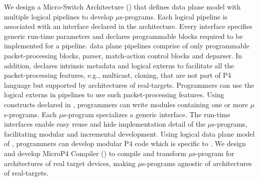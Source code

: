 \documentclass[letterpaper,twocolumn,10pt]{article}
\begin{document}
We design a Micro-Switch Architecture (\uarch) that defines data plane model with multiple logical pipelines to develop $\mu$s-programs.
Each logical pipeline is associated with an interface declared in the architecture.
Every interface specifies generic run-time parameters and declares programmable blocks required to be implemented for a pipeline.
\uarch data plane pipelines comprise of only programmable packet-processing blocks, parser, match-action control blocks and deparser. 
In addition, \uarch declares intrinsic metadata and logical externs to facilitate all the packet-processing features, e.g., multicast, cloning, that are not part of P4 language but supported by architectures of real-targets. 
Programmers can use the logical externs in \uarch pipelines to use such packet-processing features.
Using constructs declared in \uarch, programmers can write modules containing one or more $\mu$s-programs.
Each $\mu$s-program specializes a generic interface.
The run-time interfaces enable easy reuse and hide implementation detail of the $\mu$s-programs, facilitating modular and incremental development.
Using logical data plane model of \uarch, programmers can develop modular P4 code which is specific to \uarch.
We design and develop MicroP4 Compiler (\ucomp) to compile and transform $\mu$s-program for architectures of real target devices, making $\mu$s-programs agnostic of architectures of real-targets.
\end{document}
